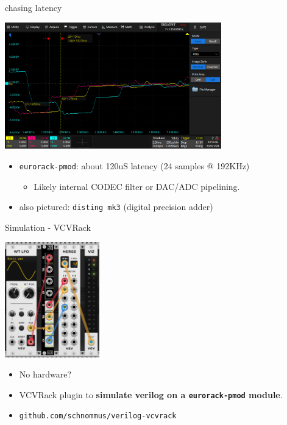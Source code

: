 \documentclass[aspectratio=169]{beamer}
\begin{document}
\begin{frame}{chasing latency}


    \begin{center}
        \includegraphics[height=5.5cm]{img/latency_scope1.png}
    \end{center}

    \begin{itemize}
        \item \texttt{eurorack-pmod}: about 120uS latency (24 samples @ 192KHz)
        \begin{itemize}
            \item Likely internal CODEC filter or DAC/ADC pipelining.
        \end{itemize}
        \item also pictured: \texttt{disting mk3} (digital precision adder)
    \end{itemize}

\end{frame}

\begin{frame}{Simulation - VCVRack}

    \begin{center}
        \includegraphics[height=5cm]{img/vcvrack.png}
    \end{center}

    \begin{itemize}
        \item No hardware?
        \item VCVRack plugin to \textbf{simulate verilog on a \texttt{eurorack-pmod} module}.
        \item \texttt{github.com/schnommus/verilog-vcvrack}
    \end{itemize}

\end{frame}
\end{document}
